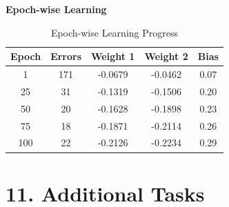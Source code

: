 \documentclass[11pt]{article}
\begin{document}
\vspace{3mm}

\textbf{Epoch-wise Learning}

\begin{table}[h]
\centering
\caption{Epoch-wise Learning Progress}
\begin{tabular}{|c|c|c|c|c|}
\hline
\textbf{Epoch} & \textbf{Errors} & \textbf{Weight 1} & \textbf{Weight 2} & \textbf{Bias} \\
\hline
1   & 171 & -0.0679 & -0.0462 & 0.07 \\
25  & 31  & -0.1319 & -0.1506 & 0.20 \\
50  & 20  & -0.1628 & -0.1898 & 0.23 \\
75  & 18  & -0.1871 & -0.2114 & 0.26 \\
100 & 22  & -0.2126 & -0.2234 & 0.29 \\
\hline
\end{tabular}

\label{tab:epoch_learning}
\end{table}


\section*{11. Additional Tasks}
\end{document}
